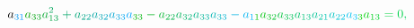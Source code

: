 \documentclass[12pt]{article}
\begin{document}
\begin{displaymath}
{a} _ { \mathcolor[RGB]{0,150,240}{3} \mathcolor[RGB]{0,150,255}{1} } \mathcolor[RGB]{0,165,0}{a} _ { \mathcolor[RGB]{0,165,15}{3} \mathcolor[RGB]{0,165,30}{3} } \mathcolor[RGB]{0,165,45}{a} _ { \mathcolor[RGB]{0,165,60}{1} \mathcolor[RGB]{0,165,75}{3} } ^ { \mathcolor[RGB]{0,165,90}{2} } \mathcolor[RGB]{0,165,105}{+} \mathcolor[RGB]{0,165,120}{a} _ { \mathcolor[RGB]{0,165,135}{2} \mathcolor[RGB]{0,165,150}{2} } \mathcolor[RGB]{0,165,165}{a} _ { \mathcolor[RGB]{0,165,180}{3} \mathcolor[RGB]{0,165,195}{2} } \mathcolor[RGB]{0,165,210}{a} _ { \mathcolor[RGB]{0,165,225}{3} \mathcolor[RGB]{0,165,240}{3} } \mathcolor[RGB]{0,165,255}{a} _ { \mathcolor[RGB]{0,180,0}{3} \mathcolor[RGB]{0,180,15}{3} } \mathcolor[RGB]{0,180,30}{-} \mathcolor[RGB]{0,180,45}{a} _ { \mathcolor[RGB]{0,180,60}{2} \mathcolor[RGB]{0,180,75}{2} } \mathcolor[RGB]{0,180,90}{a} _ { \mathcolor[RGB]{0,180,105}{3} \mathcolor[RGB]{0,180,120}{2} } \mathcolor[RGB]{0,180,135}{a} _ { \mathcolor[RGB]{0,180,150}{3} \mathcolor[RGB]{0,180,165}{3} } \mathcolor[RGB]{0,180,180}{a} _ { \mathcolor[RGB]{0,180,195}{3} \mathcolor[RGB]{0,180,210}{3} } \mathcolor[RGB]{0,180,225}{-} \mathcolor[RGB]{0,180,240}{a} _ { \mathcolor[RGB]{0,180,255}{1} \mathcolor[RGB]{0,195,0}{1} } \mathcolor[RGB]{0,195,15}{a} _ { \mathcolor[RGB]{0,195,30}{3} \mathcolor[RGB]{0,195,45}{2} } \mathcolor[RGB]{0,195,60}{a} _ { \mathcolor[RGB]{0,195,75}{3} \mathcolor[RGB]{0,195,90}{3} } \mathcolor[RGB]{0,195,105}{a} _ { \mathcolor[RGB]{0,195,120}{1} \mathcolor[RGB]{0,195,135}{3} } \mathcolor[RGB]{0,195,150}{a} _ { \mathcolor[RGB]{0,195,165}{2} \mathcolor[RGB]{0,195,180}{1} } \mathcolor[RGB]{0,195,195}{a} _ { \mathcolor[RGB]{0,195,210}{2} \mathcolor[RGB]{0,195,225}{2} } \mathcolor[RGB]{0,195,240}{a} _ { \mathcolor[RGB]{0,195,255}{3} \mathcolor[RGB]{0,210,0}{3} } \mathcolor[RGB]{0,210,15}{a} _ { \mathcolor[RGB]{0,210,30}{1} \mathcolor[RGB]{0,210,45}{3} } \mathcolor[RGB]{0,210,60}{=} \mathcolor[RGB]{0,210,75}{0} \mathcolor[RGB]{0,210,90}{,} \mathcolor[RGB]{0,210,105}{\,
}
\end{displaymath}
\end{document}
